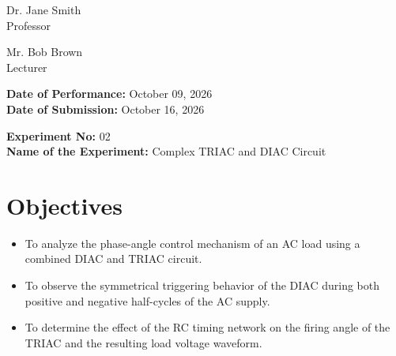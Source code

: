 \documentclass[12pt,a4paper]{article}
\begin{document}
\begin{titlepage}
\begin{minipage}[t]{0.5\textwidth}
\begin{flushright}
            Dr. Jane Smith \\
            Professor \\
            \vspace{0.3cm}
            
            Mr. Bob Brown \\
            Lecturer \\
            
            
        \end{flushright}
    \end{minipage}

    \vfill
    \textbf{Date of Performance:} October 09, 2026 \\
    \textbf{Date of Submission:} October 16, 2026
    
\end{titlepage}

\setcounter{page}{1}
\rmfamily %
\normalsize

\begin{center}
    \textbf{Experiment No:} 02 \\
    \vspace{0.2cm}
    \textbf{Name of the Experiment:} Complex TRIAC and DIAC Circuit
\end{center}
\vspace{0.5cm}


\section{Objectives}
\begin{itemize}

    \item To analyze the phase-angle control mechanism of an AC load using a combined DIAC and TRIAC circuit.

    \item To observe the symmetrical triggering behavior of the DIAC during both positive and negative half-cycles of the AC supply.

    \item To determine the effect of the RC timing network on the firing angle of the TRIAC and the resulting load voltage waveform.

\end{itemize}
\end{document}

